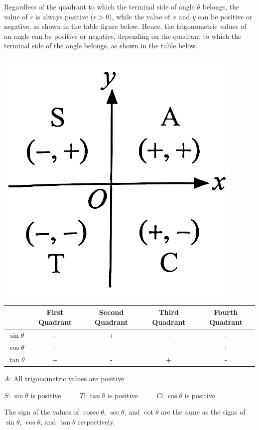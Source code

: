 \documentclass{report}
\begin{document}
Regardless of the quadrant to which the terminal side of angle $\theta$ belongs, the value of $r$ is always positive ($r > 0$), while the value of $x$ and $y$ can be positive or negative, as shown in the table figure below. Hence, the trigonometric values of an angle can be positive or negative, depending on the quadrant to which the terminal side of the angle belongs, as shown in the table below.
\begin{vwcol}[widths={0.2,0.8}, sep=4mm, justify=flush, rule=0pt]
    \includegraphics[width=0.2\linewidth]{assets/9-6.jpg}

    \parbox{0.8\textwidth}{\vspace{1.5em}\begin{tabular}{|c|c|c|c|c|}
        \hline  & First Quadrant & Second Quadrant & Third Quadrant & Fourth Quadrant \\
        \hline $\sin \theta$ & + & + & - & - \\
        \hline $\cos \theta$ & + & - & - & + \\
        \hline $\tan \theta$ & + & - & + & - \\
        \hline
        \end{tabular}}
\end{vwcol}
\begin{warn}[Note]
    
    \vspace{-1em} 
    \noindent $A$: All trigonometric values are positive

    \vspace{-1em}
    \noindent $S$: $\sin \theta$ is positive $\qquad$ $T$: $\tan \theta$ is positive $\qquad$ $C$: $\cos \theta$ is positive
    
    \vspace{-1em}
    \noindent The sign of the values of $\operatorname{cosec} \theta$, $\sec \theta$, and $\cot \theta$ are the same as the signs of $\sin \theta$, $\cos \theta$, and $\tan \theta$ respectively.
\end{warn}
\end{document}
